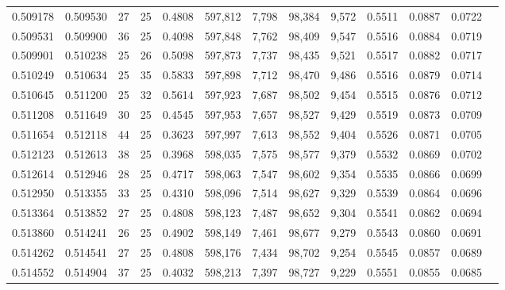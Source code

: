 \begin{tabular}{rrrrrrrrrrrrr}
0.509178 & 0.509530 &    27 &  25 &                                     0.4808 & 597,812 &   7,798 &  98,384 &   9,572 & 0.5511 & 0.0887 & 0.0722 \\
0.509531 & 0.509900 &    36 &  25 &                                     0.4098 & 597,848 &   7,762 &  98,409 &   9,547 & 0.5516 & 0.0884 & 0.0719 \\
0.509901 & 0.510238 &    25 &  26 &                                     0.5098 & 597,873 &   7,737 &  98,435 &   9,521 & 0.5517 & 0.0882 & 0.0717 \\
0.510249 & 0.510634 &    25 &  35 &                                     0.5833 & 597,898 &   7,712 &  98,470 &   9,486 & 0.5516 & 0.0879 & 0.0714 \\
0.510645 & 0.511200 &    25 &  32 &                                     0.5614 & 597,923 &   7,687 &  98,502 &   9,454 & 0.5515 & 0.0876 & 0.0712 \\
0.511208 & 0.511649 &    30 &  25 &                                     0.4545 & 597,953 &   7,657 &  98,527 &   9,429 & 0.5519 & 0.0873 & 0.0709 \\
0.511654 & 0.512118 &    44 &  25 &                                     0.3623 & 597,997 &   7,613 &  98,552 &   9,404 & 0.5526 & 0.0871 & 0.0705 \\
0.512123 & 0.512613 &    38 &  25 &                                     0.3968 & 598,035 &   7,575 &  98,577 &   9,379 & 0.5532 & 0.0869 & 0.0702 \\
0.512614 & 0.512946 &    28 &  25 &                                     0.4717 & 598,063 &   7,547 &  98,602 &   9,354 & 0.5535 & 0.0866 & 0.0699 \\
0.512950 & 0.513355 &    33 &  25 &                                     0.4310 & 598,096 &   7,514 &  98,627 &   9,329 & 0.5539 & 0.0864 & 0.0696 \\
0.513364 & 0.513852 &    27 &  25 &                                     0.4808 & 598,123 &   7,487 &  98,652 &   9,304 & 0.5541 & 0.0862 & 0.0694 \\
0.513860 & 0.514241 &    26 &  25 &                                     0.4902 & 598,149 &   7,461 &  98,677 &   9,279 & 0.5543 & 0.0860 & 0.0691 \\
0.514262 & 0.514541 &    27 &  25 &                                     0.4808 & 598,176 &   7,434 &  98,702 &   9,254 & 0.5545 & 0.0857 & 0.0689 \\
0.514552 & 0.514904 &    37 &  25 &                                     0.4032 & 598,213 &   7,397 &  98,727 &   9,229 & 0.5551 & 0.0855 & 0.0685 \\

\end{tabular}
